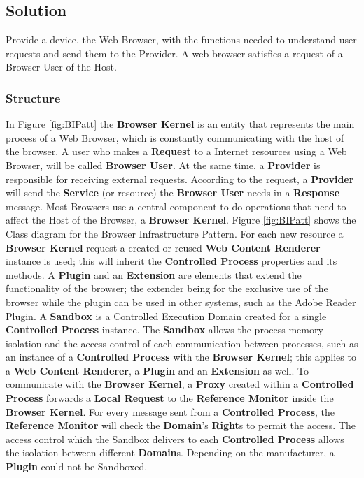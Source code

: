 \documentclass{sig-alternate-05-2015}
\begin{document}
  \subsection*{Solution}
  Provide a device, the Web Browser, with the functions needed to understand user requests and send them to the Provider. A web browser satisfies a request of a Browser User of the Host.

    \subsubsection*{Structure}
    In Figure \ref{fig:BIPatt} the \textbf{Browser Kernel} is an entity that represents the main process of a Web Browser, which is constantly communicating with the host of the browser. A user who makes a \textbf{Request} to a Internet resources using a Web Browser, will be called \textbf{Browser User}. At the same time, a \textbf{Provider} is responsible for receiving external requests. According to the request, a \textbf{Provider} will send the \textbf{Service} (or resource) the \textbf{Browser User} needs in a \textbf{Response} message. Most Browsers use a central component to do operations that need to affect the Host of the Browser, a \textbf{Browser Kernel}. Figure \ref{fig:BIPatt} shows the Class diagram for the Browser Infrastructure Pattern. For each new resource a \textbf{Browser Kernel} request a created or reused \textbf{Web Content Renderer} instance is used; this will inherit the \textbf{Controlled Process} properties and its methods. A \textbf{Plugin} and an \textbf{Extension} are elements that extend the functionality of the browser; the extender being for the exclusive use of the browser while the plugin can be used in other systems, such as the Adobe Reader Plugin. A \textbf{Sandbox} is a Controlled Execution Domain \cite{fernandez2013security} created for a single \textbf{Controlled Process} instance. The \textbf{Sandbox} allows the process memory isolation and the access control of each communication between processes, such as an instance of a \textbf{Controlled Process} with the \textbf{Browser Kernel}; this applies to a \textbf{Web Content Renderer}, a \textbf{Plugin} and an \textbf{Extension} as well. To communicate with the \textbf{Browser Kernel}, a \textbf{Proxy} created within a \textbf{Controlled Process} forwards a \textbf{Local Request} to the \textbf{Reference Monitor} inside the \textbf{Browser Kernel}. For every message sent from a \textbf{Controlled Process}, the \textbf{Reference Monitor} will check the \textbf{Domain}'s \textbf{Right}s to permit the access. The access control which the Sandbox delivers to each \textbf{Controlled Process} allows the isolation between different \textbf{Domain}s. Depending on the manufacturer, a \textbf{Plugin} could not be Sandboxed. 
\end{document}
